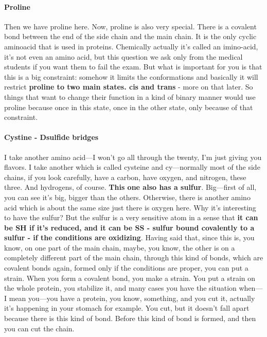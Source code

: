 \paragraph{Proline}
Then we have proline here. Now, proline is also very special. There is a covalent bond between the end of the side chain and the main chain. It is the only cyclic aminoacid that is used in proteins. Chemically actually it's called an imino-acid, it's not even an amino acid, but this question we ask only from the medical students if you want them to fail the exam.
But what is important for you is that this is a big constraint: somehow it limits the conformations and basically it will restrict \textbf{proline to two main states. cis and trans} - more on that later. So things that want to change their function in a kind of binary manner would use proline because once in this state, once in the other state, only because of that constraint. 

\paragraph{Cystine - Dsulfide bridges}
 I take another amino acid—I won't go all through the twenty, I'm just giving you flavors. I take another which is called cysteine and cy—normally most of the side chains, if you look carefully, have a carbon, have oxygen, and nitrogen, these three. And hydrogens, of course. \textbf{This one also has a sulfur}. Big—first of all, you can see it's big, bigger than the others. Otherwise, there is another amino acid which is about the same size just there is oxygen here. Why it's interesting to have the sulfur? But the sulfur is a very sensitive atom in a sense that \textbf{it can be SH if it's reduced, and it can be SS - sulfur bound covalently to a sulfur - if the conditions are oxidizing}. Having said that, since this is, you know, on one part of the main chain, maybe, you know, the other is on a completely different part of the main chain, through this kind of bonds, which are covalent bonds again, formed only if the conditions are proper, you can put a strain. When you form a covalent bond, you make a strain. You put a strain on the whole protein, you stabilize it, and many cases you have the situation when—I mean you—you have a protein, you know, something, and you cut it, actually it's happening in your stomach for example. You cut, but it doesn't fall apart because there is this kind of bond. Before this kind of bond is formed, and then you can cut the chain. 

